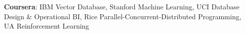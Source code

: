\textbf{Coursera}: IBM Vector Database, Stanford Machine Learning, UCI Database Design \& Operational BI, Rice Parallel-Concurrent-Distributed Programming, UA Reinforcement Learning 
